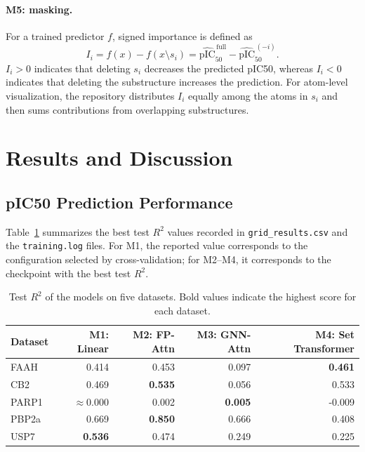 \paragraph{M5: masking.}
For a trained predictor \(f\), signed importance is defined as
\begin{equation}
    I_i =
    f(x)-f(x\setminus s_i)
    =\widehat{\mathrm{pIC}}_{50}^{\,\mathrm{full}}
    -\widehat{\mathrm{pIC}}_{50}^{\,(-i)}.
\end{equation}
\(I_i>0\) indicates that deleting \(s_i\) decreases the predicted pIC50, whereas
\(I_i<0\) indicates that deleting the substructure increases the prediction.
For atom-level visualization, the repository distributes \(I_i\) equally among
the atoms in \(s_i\) and then sums contributions from overlapping substructures.


\section{Results and Discussion}
\label{sec:results}

\subsection{pIC50 Prediction Performance}

Table~\ref{tab:r2_results} summarizes the best test \(R^2\) values recorded in
\texttt{grid\_results.csv} and the \texttt{training.log} files. For M1, the
reported value corresponds to the configuration selected by cross-validation;
for M2--M4, it corresponds to the checkpoint with the best test \(R^2\).

\begin{table}[htbp]
    \centering
    \caption{Test \(R^2\) of the models on five datasets. Bold values indicate
    the highest score for each dataset.}
    \label{tab:r2_results}
    \begin{tabular}{lrrrr}
        \hline
        Dataset & M1: Linear & M2: FP-Attn & M3: GNN-Attn
                     & M4: Set Transformer \\
        \hline
        FAAH  & 0.414 & 0.453 & 0.097 & \textbf{0.461} \\
        CB2   & 0.469 & \textbf{0.535} & 0.056 & 0.533 \\
        PARP1 & $\approx 0.000$ & 0.002 & \textbf{0.005} & -0.009 \\
        PBP2a & 0.669 & \textbf{0.850} & 0.666 & 0.408 \\
        USP7  & \textbf{0.536} & 0.474 & 0.249 & 0.225 \\
        \hline
    \end{tabular}
\end{table}

